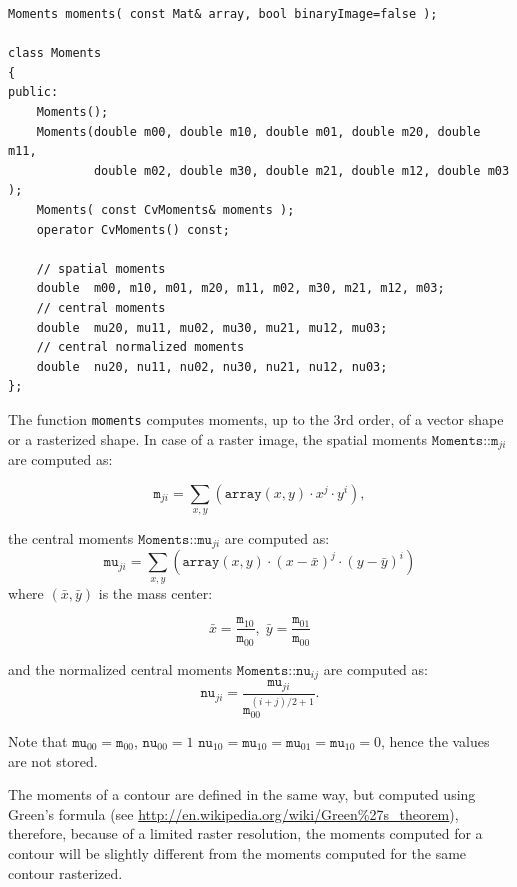\begin{lstlisting}
Moments moments( const Mat& array, bool binaryImage=false );

class Moments
{
public:
    Moments();
    Moments(double m00, double m10, double m01, double m20, double m11,
            double m02, double m30, double m21, double m12, double m03 );
    Moments( const CvMoments& moments );
    operator CvMoments() const;
    
    // spatial moments
    double  m00, m10, m01, m20, m11, m02, m30, m21, m12, m03;
    // central moments
    double  mu20, mu11, mu02, mu30, mu21, mu12, mu03;
    // central normalized moments
    double  nu20, nu11, nu02, nu30, nu21, nu12, nu03;
};
\end{lstlisting}
\begin{description}
\end{description}

The function \texttt{moments} computes moments, up to the 3rd order, of a vector shape or a rasterized shape.
In case of a raster image, the spatial moments $\texttt{Moments::m}_{ji}$ are computed as:

\[\texttt{m}_{ji}=\sum_{x,y} \left(\texttt{array}(x,y) \cdot x^j \cdot y^i\right),\]

the central moments $\texttt{Moments::mu}_{ji}$ are computed as:
\[\texttt{mu}_{ji}=\sum_{x,y} \left(\texttt{array}(x,y) \cdot (x - \bar{x})^j \cdot (y - \bar{y})^i\right)\]
where $(\bar{x}, \bar{y})$ is the mass center:

\[
\bar{x}=\frac{\texttt{m}_{10}}{\texttt{m}_{00}},\; \bar{y}=\frac{\texttt{m}_{01}}{\texttt{m}_{00}}
\]

and the normalized central moments $\texttt{Moments::nu}_{ij}$ are computed as:
\[\texttt{nu}_{ji}=\frac{\texttt{mu}_{ji}}{\texttt{m}_{00}^{(i+j)/2+1}}.\]

Note that $\texttt{mu}_{00}=\texttt{m}_{00}$, $\texttt{nu}_{00}=1$ $\texttt{nu}_{10}=\texttt{mu}_{10}=\texttt{mu}_{01}=\texttt{mu}_{10}=0$, hence the values are not stored.

The moments of a contour are defined in the same way, but computed using Green's formula
(see \url{http://en.wikipedia.org/wiki/Green%27s_theorem}), therefore, because of a limited raster resolution, the moments computed for a contour will be slightly different from the moments computed for the same contour rasterized.

